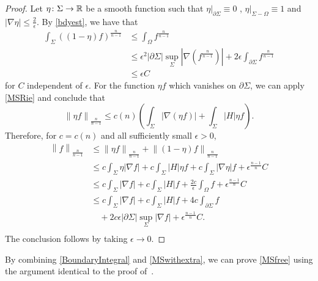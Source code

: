 \begin{proof}
    Let $\eta \colon \Sigma \to \mathbb{R}$ be a smooth function such that $\eta |_{\partial \Sigma } \equiv 0$ , $\eta |_{ \Sigma - \Omega } \equiv 1$ and $\left| \nabla \eta  \right| \leq \frac{2}{\epsilon }$. By \autoref{bdyest}, we have that 
    \begin{equation*}
    \begin{split}
        \int_{\Sigma} \left( \left( 1-\eta  \right) f \right) ^{\frac{n}{n-1}}
    &\leq \int_{\Omega }^{} f_{}^{\frac{n}{n-1}}   \\
    &\leq \epsilon ^2 \left| \partial \Sigma  \right| \sup _{\Sigma }\left| \nabla \left( f_{}^{\frac{n}{n-1}} \right)  \right| +2 \epsilon \int_{\partial \Sigma} f_{}^{\frac{n}{n-1}} \\
    &\leq \epsilon C
    \end{split}
    \end{equation*}
    for $C$ independent of $\epsilon $. For the function $\eta f$ which vanishes on $\partial \Sigma $, we can apply \autoref{MSRie} and conclude that 
    \[\left\| \eta  f \right\| _{\frac{n}{n-1}} \leq  c(n) \left( \int_{\Sigma} \left| \nabla (\eta f) \right| + \int_{\Sigma} \left| H  \right|\eta f  \right). \] 
    Therefore, for $c=c(n)$ and all sufficiently small $\epsilon >0$,
    \begin{equation*}
    \begin{split}
        \left\| f \right\| _{\frac{n}{n-1}} 
    &\leq \left\| \eta  f \right\| _{\frac{n}{n-1}}+\left\| (1-\eta )f \right\| _{\frac{n}{n-1}}  \\
    & \leq c \int_{\Sigma} \eta \left| \nabla f \right| +c \int_{\Sigma} \left| H \right| \eta f + c \int_{\Sigma} \left| \nabla \eta  \right| f + \epsilon ^{\frac{n-1}{n}}C\\
    &\leq c \int_{\Sigma}  \left| \nabla f \right| +c \int_{\Sigma} \left| H \right| f + \frac{2c}{\epsilon } \int_{\Omega }  f + \epsilon ^{\frac{n-1}{n}}C\\
    &\leq c \int_{\Sigma}  \left| \nabla f \right| +c \int_{\Sigma} \left| H \right| f +4c \int_{\partial \Sigma} f\\
    &\quad + 2c \epsilon  \left| \partial \Sigma  \right| \sup _{\Sigma }\left| \nabla f \right|+ \epsilon ^{\frac{n-1}{n}}C.\\
    \end{split}
    \end{equation*}
    The conclusion follows by taking $\epsilon \to 0$.
\end{proof}

By combining \autoref{BoundaryIntegral} and \autoref{MSwithextra}, we can prove \autoref{MSfree} using the argument identical to the proof of~\cite[Theorem 2.3]{edelen_convexity_2016}.



